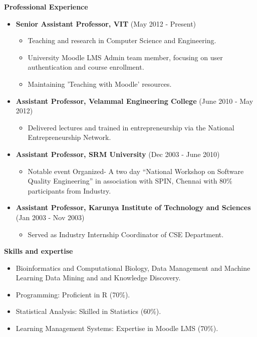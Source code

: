 \documentclass[a4paper,10pt]{article}
\newcommand{\cvsection}[1]{%
    \vspace{2mm}
    \begin{tcolorbox}
        \textbf{\large #1}
    \end{tcolorbox}
    \vspace{-4mm}
}
\begin{document}
\cvsection{Professional Experience}
\begin{itemize}[leftmargin=*]
    \item \textbf{Senior Assistant Professor, VIT} (May 2012 - Present)
        \begin{itemize}[leftmargin=*]
            \item Teaching and research in Computer Science and Engineering.
            \item University Moodle LMS Admin team member, focusing on user authentication and course enrollment.
            \item Maintaining 'Teaching with Moodle' resources.
        \end{itemize}
    \item \textbf{Assistant Professor, Velammal Engineering College} (June 2010 - May 2012)
        \begin{itemize}[leftmargin=*]
            \item Delivered lectures and trained in entrepreneurship via the National Entrepreneurship Network.
        \end{itemize}
        \item \textbf{Assistant Professor, SRM University} (Dec 2003 - June 2010)
        \begin{itemize}[leftmargin=*]
        	\item Notable event Organized- A two day “National Workshop on Software Quality Engineering” in association with SPIN, Chennai with 80\% participants from Industry.
        \end{itemize}
        \item \textbf{Assistant Professor, Karunya Institute of Technology and Sciences} (Jan 2003 - Nov 2003)
        \begin{itemize}[leftmargin=*]
        	\item Served as Industry Internship Coordinator of CSE Department.
        \end{itemize}
\end{itemize}

\cvsection{Skills and expertise}
\begin{itemize}[leftmargin=*]
	\item Bioinformatics and Computational Biology, Data Management and Machine Learning
	Data Mining and and Knowledge Discovery.
	\item Programming: Proficient in R (70\%).
	\item Statistical Analysis: Skilled in Statistics (60\%).
	\item Learning Management Systems: Expertise in Moodle LMS (70\%).
\end{itemize}
\end{document}
